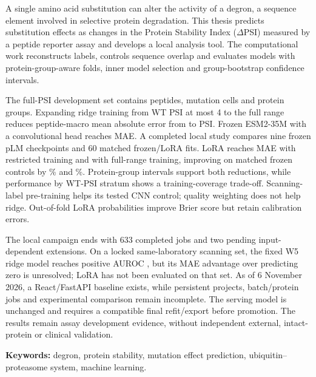 
A single amino acid substitution can alter the activity of a degron, a sequence element involved in
selective protein degradation. This thesis predicts substitution effects as changes in the Protein
Stability Index ($\Delta$PSI) measured by a peptide reporter assay and develops a local analysis tool.
The computational work reconstructs labels, controls sequence overlap and evaluates models with
protein-group-aware folds, inner model selection and group-bootstrap confidence intervals.

The full-PSI development set contains \nVthreeNPeptides{} peptides, \nVthreeNCells{} mutation cells
and \nVthreeNGroups{} protein groups. Expanding ridge training from WT PSI at most 4 to the full
range reduces peptide-macro mean absolute error from \nVthreeRidgeB{} to \nVthreeRidgeD{} PSI.
Frozen ESM2-35M with a convolutional head reaches \nVthreeCnnD{} MAE. A completed local study
compares nine frozen pLM checkpoints and 60 matched frozen/LoRA fits. LoRA reaches
\nCampaignLoraB{} MAE with restricted training and \nCampaignLoraD{} with full-range training,
improving on matched frozen controls by \nCampaignGainB\% and \nCampaignGainD\%.
Protein-group intervals support both reductions, while performance by WT-PSI stratum shows a
training-coverage trade-off. Scanning-label pre-training helps its tested CNN control; quality weighting
does not help ridge. Out-of-fold LoRA probabilities improve Brier score but retain calibration errors.

The local campaign ends with 633 completed jobs and two pending input-dependent extensions.
On a locked same-laboratory scanning set, the fixed W5 ridge model reaches positive AUROC
\nCampaignTAuc{}, but its MAE advantage over predicting zero is unresolved; LoRA has not been
evaluated on that set. As of 6 November 2026, a React/FastAPI baseline exists, while persistent
projects, batch/protein jobs and experimental comparison remain incomplete. The serving model is
unchanged and requires a compatible final refit/export before promotion. The results remain assay
development evidence, without independent external, intact-protein or clinical validation.

\par\vspace{6bp}\noindent\textbf{Keywords:} degron, protein stability, mutation effect prediction, ubiquitin--proteasome system, machine learning.
